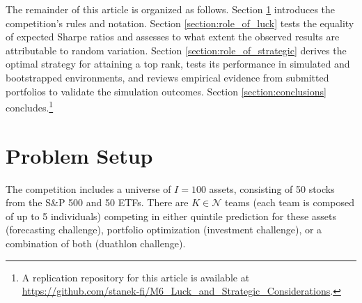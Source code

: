 \documentclass[3p,times,twocolumn]{elsarticle}
\begin{document}
The remainder of this article is organized as follows.
Section \ref{subsection:problem_setup} introduces the competition's rules and notation.
Section \ref{section:role_of_luck} tests the equality of expected Sharpe ratios and assesses to what extent the observed results are attributable to random variation.
Section \ref{section:role_of_strategic} derives the optimal strategy for attaining a top rank, tests its performance in simulated and bootstrapped environments, and reviews empirical evidence from submitted portfolios to validate the simulation outcomes.
Section \ref{section:conclusions} concludes.\footnote{
    A replication repository for this article is available at \url{https://github.com/stanek-fi/M6_Luck_and_Strategic_Considerations}. 
}

\section{Problem Setup}\label{subsection:problem_setup}

The competition includes a universe of $I=100$ assets, consisting of 50 stocks from the S\&P 500 and 50 ETFs. 
There are $K\in \mathcal{N}$ teams (each team is composed of up to 5 individuals) competing in either quintile prediction for these assets (forecasting challenge), portfolio optimization (investment challenge), or a combination of both (duathlon challenge).
\end{document}
